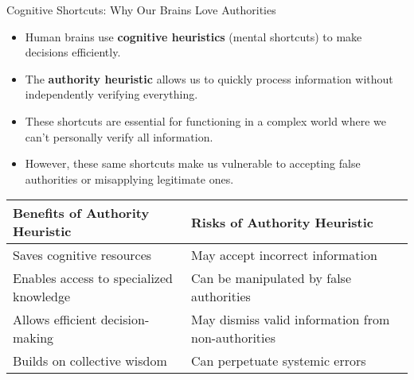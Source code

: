 \documentclass{beamer}
\begin{document}
\begin{frame}{Cognitive Shortcuts: Why Our Brains Love Authorities}
    \begin{itemize}
        \item Human brains use \textbf{cognitive heuristics} (mental shortcuts) to make decisions efficiently.
        \item The \textbf{authority heuristic} allows us to quickly process information without independently verifying everything.
        \item These shortcuts are essential for functioning in a complex world where we can't personally verify all information.
        \item However, these same shortcuts make us vulnerable to accepting false authorities or misapplying legitimate ones.
    \end{itemize}
    
    \begin{table}
        \scriptsize
        \centering
        \begin{tabular}{|p{5cm}|p{5cm}|}
            \hline
            \textbf{Benefits of Authority Heuristic} & \textbf{Risks of Authority Heuristic} \\
            \hline
            Saves cognitive resources & May accept incorrect information \\
            Enables access to specialized knowledge & Can be manipulated by false authorities \\
            Allows efficient decision-making & May dismiss valid information from non-authorities \\
            Builds on collective wisdom & Can perpetuate systemic errors \\
            \hline
        \end{tabular}
    \end{table}
\end{frame}
\end{document}
